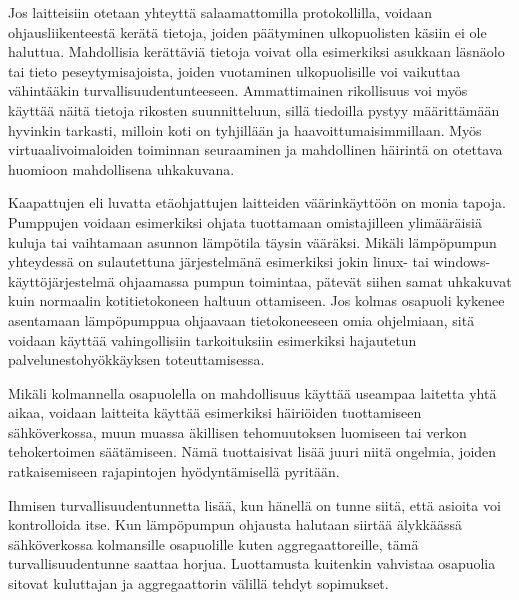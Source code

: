   Jos laitteisiin otetaan yhteyttä salaamattomilla protokollilla, voidaan ohjausliikenteestä kerätä tietoja, joiden päätyminen ulkopuolisten käsiin ei ole haluttua. Mahdollisia kerättäviä tietoja voivat olla esimerkiksi asukkaan läsnäolo tai tieto peseytymisajoista, joiden vuotaminen ulkopuolisille voi vaikuttaa vähintääkin turvallisuudentunteeseen. Ammattimainen rikollisuus voi myös käyttää näitä tietoja rikosten suunnitteluun, sillä tiedoilla pystyy määrittämään hyvinkin tarkasti, milloin koti on tyhjillään ja haavoittumaisimmillaan. Myös virtuaalivoimaloiden toiminnan seuraaminen ja mahdollinen häirintä on otettava huomioon mahdollisena uhkakuvana.

  Kaapattujen eli luvatta etäohjattujen laitteiden väärinkäyttöön on monia tapoja. Pumppujen voidaan esimerkiksi ohjata tuottamaan omistajilleen ylimääräisiä kuluja tai vaihtamaan asunnon lämpötila täysin vääräksi. Mikäli lämpöpumpun yhteydessä on sulautettuna järjestelmänä esimerkiksi jokin linux- tai windows-käyttöjärjestelmä ohjaamassa pumpun toimintaa, pätevät siihen samat uhkakuvat kuin normaalin kotitietokoneen haltuun ottamiseen. Jos kolmas osapuoli kykenee asentamaan lämpöpumppua ohjaavaan tietokoneeseen omia ohjelmiaan, sitä voidaan käyttää vahingollisiin tarkoituksiin esimerkiksi hajautetun palvelunestohyökkäyksen toteuttamisessa.

  Mikäli kolmannella osapuolella on mahdollisuus käyttää useampaa laitetta yhtä aikaa, voidaan laitteita käyttää esimerkiksi häiriöiden tuottamiseen sähköverkossa, muun muassa äkillisen tehomuutoksen luomiseen tai verkon tehokertoimen säätämiseen. Nämä tuottaisivat lisää juuri niitä ongelmia, joiden ratkaisemiseen rajapintojen hyödyntämisellä pyritään.

  Ihmisen turvallisuudentunnetta lisää, kun hänellä on tunne siitä, että asioita voi kontrolloida itse. Kun lämpöpumpun ohjausta halutaan siirtää älykkäässä sähköverkossa kolmansille osapuolille kuten aggregaattoreille, tämä turvallisuudentunne saattaa horjua. Luottamusta kuitenkin vahvistaa osapuolia sitovat kuluttajan ja aggregaattorin välillä tehdyt sopimukset.
